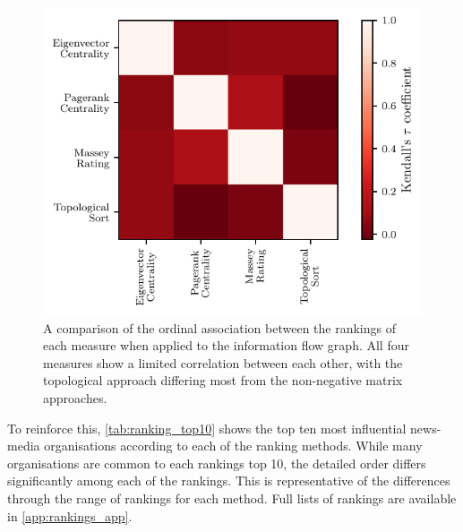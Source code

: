 \begin{figure}[!htbp]
\centering
\includegraphics{chapter4/figs/compare_methods.pdf}
\caption{A comparison of the ordinal association between the rankings of each measure when applied to the information flow graph. All four measures show a limited correlation between each other, with the topological approach differing most from the non-negative matrix approaches.}\label{fig:rank_comparison}
\end{figure}

To reinforce this, \autoref{tab:ranking_top10} shows the top ten most influential news-media organisations according to each of the ranking methods. While many organisations are common to each rankings top 10, the detailed order differs significantly among each of the rankings. This is representative of the differences through the range of rankings for each method.  Full lists of rankings are available in \autoref{app:rankings_app}.


